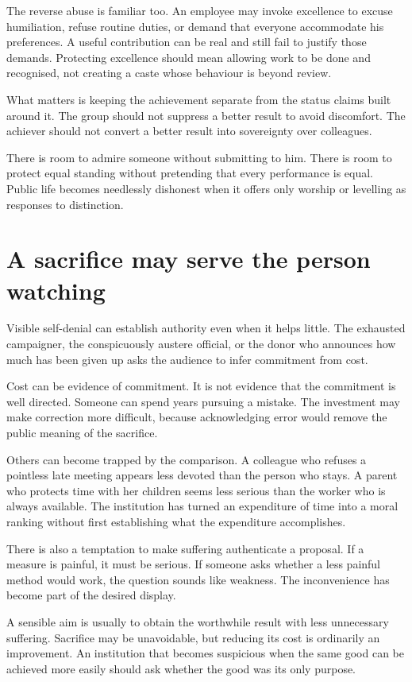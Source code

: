 \documentclass[12pt,a4paper]{book}
\begin{document}
The reverse abuse is familiar too. An employee may invoke excellence to excuse humiliation, refuse routine duties, or demand that everyone accommodate his preferences. A useful contribution can be real and still fail to justify those demands. Protecting excellence should mean allowing work to be done and recognised, not creating a caste whose behaviour is beyond review.

What matters is keeping the achievement separate from the status claims built around it. The group should not suppress a better result to avoid discomfort. The achiever should not convert a better result into sovereignty over colleagues.

There is room to admire someone without submitting to him. There is room to protect equal standing without pretending that every performance is equal. Public life becomes needlessly dishonest when it offers only worship or levelling as responses to distinction.

\section*{A sacrifice may serve the person watching}

Visible self-denial can establish authority even when it helps little. The exhausted campaigner, the conspicuously austere official, or the donor who announces how much has been given up asks the audience to infer commitment from cost.

Cost can be evidence of commitment. It is not evidence that the commitment is well directed. Someone can spend years pursuing a mistake. The investment may make correction more difficult, because acknowledging error would remove the public meaning of the sacrifice.

Others can become trapped by the comparison. A colleague who refuses a pointless late meeting appears less devoted than the person who stays. A parent who protects time with her children seems less serious than the worker who is always available. The institution has turned an expenditure of time into a moral ranking without first establishing what the expenditure accomplishes.

There is also a temptation to make suffering authenticate a proposal. If a measure is painful, it must be serious. If someone asks whether a less painful method would work, the question sounds like weakness. The inconvenience has become part of the desired display.

A sensible aim is usually to obtain the worthwhile result with less unnecessary suffering. Sacrifice may be unavoidable, but reducing its cost is ordinarily an improvement. An institution that becomes suspicious when the same good can be achieved more easily should ask whether the good was its only purpose.
\end{document}

